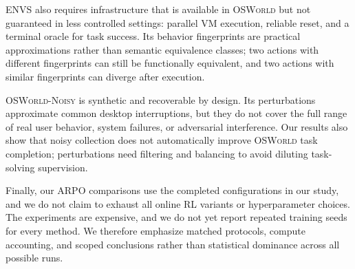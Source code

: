 \documentclass[11pt]{article}
\begin{document}
ENVS also requires infrastructure that is available in \textsc{OSWorld} but not guaranteed in less controlled settings: parallel VM execution, reliable reset, and a terminal oracle for task success. Its behavior fingerprints are practical approximations rather than semantic equivalence classes; two actions with different fingerprints can still be functionally equivalent, and two actions with similar fingerprints can diverge after execution.

\textsc{OSWorld-Noisy} is synthetic and recoverable by design. Its perturbations approximate common desktop interruptions, but they do not cover the full range of real user behavior, system failures, or adversarial interference. Our results also show that noisy collection does not automatically improve \textsc{OSWorld} task completion; perturbations need filtering and balancing to avoid diluting task-solving supervision.

Finally, our ARPO comparisons use the completed configurations in our study, and we do not claim to exhaust all online RL variants or hyperparameter choices. The experiments are expensive, and we do not yet report repeated training seeds for every method. We therefore emphasize matched protocols, compute accounting, and scoped conclusions rather than statistical dominance across all possible runs.
\end{document}

